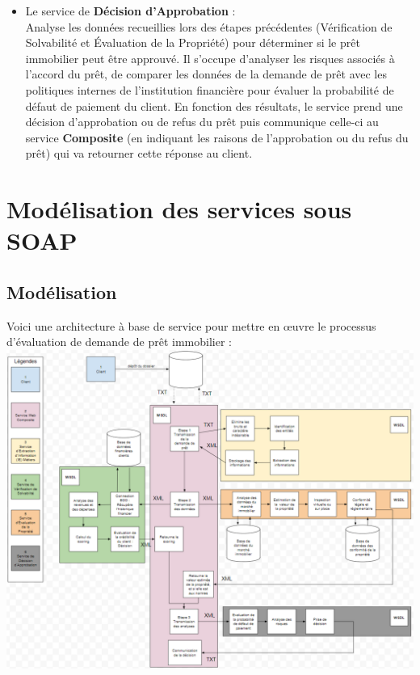 \documentclass{article}
\begin{document}
\begin{itemize}
			\item Le service de \textbf{Décision d'Approbation} : \\
			
			Analyse les données recueillies lors des étapes précédentes (Vérification de Solvabilité et Évaluation de la Propriété) pour déterminer si le prêt immobilier peut être approuvé. Il s’occupe d’analyser les risques associés à l'accord du prêt, de comparer les données de la demande de prêt avec les politiques internes de l'institution financière pour évaluer la probabilité de défaut de paiement du client. En fonction des résultats, le service prend une décision d'approbation ou de refus du prêt puis communique celle-ci au service \textbf{Composite} (en indiquant les raisons de l'approbation ou du refus du prêt) qui va retourner cette réponse au client.
			
		\end{itemize}
	
	\newpage
	\section{Modélisation des services sous SOAP}
	\subsection{Modélisation}
	Voici une architecture à base de service pour mettre en œuvre le processus d’évaluation de demande de prêt immobilier :
	\\
	\includegraphics[width=\textwidth]{Images/6.1/modelisation_XML.png}
 
\end{document}

